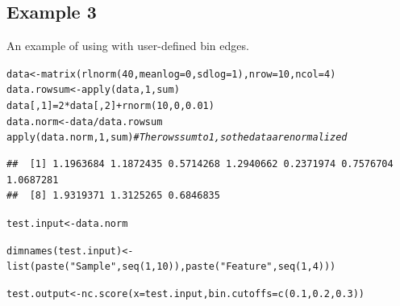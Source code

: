 \documentclass{article}\usepackage[]{graphicx}\usepackage[usenames,dvipsnames]{color}
\newcommand{\hlnum}[1]{\textcolor[rgb]{0.816,0.125,0.439}{#1}}%
\newcommand{\hlstr}[1]{\textcolor[rgb]{0.251,0.627,0.251}{#1}}%
\newcommand{\hlcom}[1]{\textcolor[rgb]{0.502,0.502,0.502}{\textit{#1}}}%
\newcommand{\hlopt}[1]{\textcolor[rgb]{0,0,0}{#1}}%
\newcommand{\hlstd}[1]{\textcolor[rgb]{0.251,0.251,0.251}{#1}}%
\newcommand{\hlkwb}[1]{\textcolor[rgb]{0,0,0}{#1}}%
\newcommand{\hlkwc}[1]{\textcolor[rgb]{0.251,0.251,0.251}{#1}}%
\newcommand{\hlkwd}[1]{\textcolor[rgb]{0.878,0.439,0.125}{#1}}%
\newenvironment{knitrout}{}{} %
\begin{document}
\subsection{Example 3}

An example of using  with user-defined bin edges.

\begin{knitrout}
\color{fgcolor}\begin{kframe}
\begin{alltt}
\hlstd{data} \hlkwb{<-} \hlkwd{matrix}\hlstd{(}\hlkwd{rlnorm}\hlstd{(}\hlnum{40}\hlstd{,}\hlkwc{meanlog}\hlstd{=}\hlnum{0}\hlstd{,}\hlkwc{sdlog}\hlstd{=}\hlnum{1}\hlstd{),}\hlkwc{nrow}\hlstd{=}\hlnum{10}\hlstd{,}\hlkwc{ncol}\hlstd{=}\hlnum{4}\hlstd{)}
\hlstd{data.rowsum} \hlkwb{<-} \hlkwd{apply}\hlstd{(data,}\hlnum{1}\hlstd{,sum)}
\hlstd{data[,}\hlnum{1}\hlstd{]} \hlkwb{=} \hlnum{2}\hlopt{*}\hlstd{data[,}\hlnum{2}\hlstd{]} \hlopt{+} \hlkwd{rnorm}\hlstd{(}\hlnum{10}\hlstd{,}\hlnum{0}\hlstd{,}\hlnum{0.01}\hlstd{)}
\hlstd{data.norm} \hlkwb{<-} \hlstd{data}\hlopt{/}\hlstd{data.rowsum}
\hlkwd{apply}\hlstd{(data.norm,}\hlnum{1}\hlstd{,sum)}  \hlcom{# The rows sum to 1, so the data are normalized}
\end{alltt}
\begin{verbatim}
##  [1] 1.1963684 1.1872435 0.5714268 1.2940662 0.2371974 0.7576704 1.0687281
##  [8] 1.9319371 1.3125265 0.6846835
\end{verbatim}
\begin{alltt}
\hlstd{test.input} \hlkwb{<-} \hlstd{data.norm}

\hlkwd{dimnames}\hlstd{(test.input)} \hlkwb{<-} \hlkwd{list}\hlstd{(}\hlkwd{paste}\hlstd{(}\hlstr{"Sample"}\hlstd{,}\hlkwd{seq}\hlstd{(}\hlnum{1}\hlstd{,}\hlnum{10}\hlstd{)),}\hlkwd{paste}\hlstd{(}\hlstr{"Feature"}\hlstd{,}\hlkwd{seq}\hlstd{(}\hlnum{1}\hlstd{,}\hlnum{4}\hlstd{)))}

\hlstd{test.output} \hlkwb{<-} \hlkwd{nc.score}\hlstd{(}\hlkwc{x}\hlstd{=test.input,}\hlkwc{bin.cutoffs}\hlstd{=}\hlkwd{c}\hlstd{(}\hlnum{0.1}\hlstd{,}\hlnum{0.2}\hlstd{,}\hlnum{0.3}\hlstd{))}
\end{alltt}
\end{kframe}
\end{knitrout}
\end{document}
